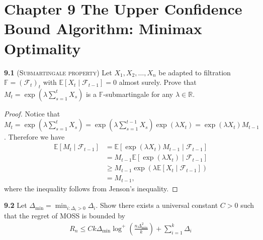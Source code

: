 \chapter*{Chapter 9 The Upper Confidence Bound Algorithm: Minimax Optimality}
\label{sec:ninth}

\noindent\textbf{9.1} (\textsc{Submartingale property}) Let $X_{1}, X_{2}, \ldots, X_{n}$ be adapted to filtration $\mathbb{F}=\left(\mathcal{F}_{t}\right)_{t}$ with $\mathbb{E}\left[X_{t} \mid \mathcal{F}_{t-1}\right]=0$ almost surely.
Prove that $M_{t}=\exp \left(\lambda \sum_{s=1}^{t} X_{s}\right)$ is a $\mathbb{F}$-submartingale for any $\lambda \in \mathbb{R}$.

\begin{proof}
    Notice that $M_t = \exp(\lambda \sum_{s=1}^t X_s) = \exp(\lambda \sum_{s=1}^{t-1} X_s)\exp(\lambda X_t) = \exp(\lambda X_t) M_{t-1}$.
    Therefore we have
    \begin{equation*}
        \begin{aligned}
            \mathbb{E}\left[M_{t} \mid \mathcal{F}_{t-1}\right]
            &= \mathbb{E}\left[\exp(\lambda X_t) M_{t-1} \mid \mathcal{F}_{t-1}\right]\\
            &= M_{t-1} \mathbb{E}\left[\exp(\lambda X_t) \mid \mathcal{F}_{t-1}\right]\\
            &\geq M_{t-1} \exp(\lambda \mathbb{E}\left[X_{t} \mid \mathcal{F}_{t-1}\right])\\
            &= M_{t-1},
        \end{aligned}
    \end{equation*}
    where the inequality follows from Jenson's inequality.
\end{proof}


\noindent\textbf{9.2} Let $\Delta_{\min} = \min_{i:\Delta_i>0} \Delta_i$. Show there exists a universal constant $C > 0$ such that the regret of MOSS is bounded by
\begin{align*}
    R_n \leq Ck\Delta_{\min} \log^+(\frac{n\Delta_{\min}^2}{k}) + \sum_{i=1}^{k} \Delta_i 
\end{align*}

